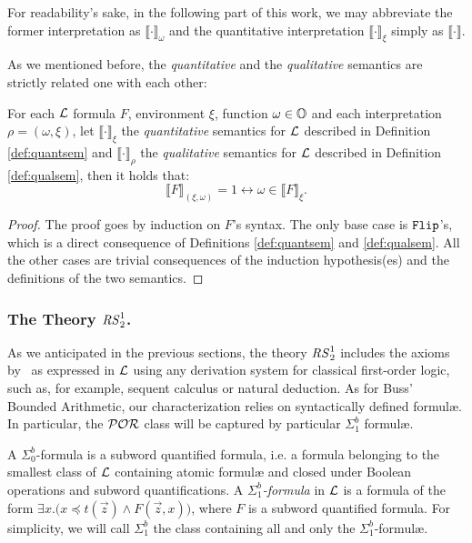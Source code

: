 \begin{notation}
For readability's sake, in the following part of this work, we may abbreviate
the former interpretation as $\llbracket \cdot
\rrbracket_\omega$
and the quantitative interpretation
$\llbracket \cdot\rrbracket_\xi$
simply as $\llbracket \cdot\rrbracket$.
\end{notation}

As we mentioned before, the \emph{quantitative} and the \emph{qualitative} semantics are strictly related one with each other:


\begin{remark}
\label{rem:quantqual}
For each $\mathcal{L}$ formula $F$, environment $\xi$, function $\omega \in \mathbb{O}$ and each interpretation $\rho=(\omega, \xi)$, let $\llbracket \cdot \rrbracket_\xi$ the \emph{quantitative} semantics for $\mathcal{L}$ described in Definition \ref{def:quantsem} and $\llbracket \cdot \rrbracket_{\rho}$ the \emph{qualitative} semantics for $\mathcal{L}$ described in Definition \ref{def:qualsem},
then it holds that:
$$
\llbracket F\big\rrbracket_{(\xi, \omega)} = 1 \leftrightarrow
\omega \in \llbracket F \rrbracket_\xi.
$$
\end{remark}
\begin{proof}
  The proof goes by induction on $F$'s syntax. The only base case is $\mathtt{Flip}$'s, which is a direct consequence of Definitions \ref{def:quantsem} and \ref{def:qualsem}. All the other cases are trivial consequences of the induction hypothesis(es) and the definitions of the two semantics.
\end{proof}
\subsubsection{The Theory ${\mathit{RS}^1_2}$.}
\label{subsub:S13}

As we anticipated in the previous sections, the theory ${\mathit{RS}^1_2}$ includes
the axioms by~\cite{Ferreira90} as
expressed in $\mathcal{L}$ using any derivation system for classical first-order logic, such as, for example, sequent calculus or natural deduction.
%
As for Buss' Bounded Arithmetic, our characterization relies on syntactically defined formul\ae{}. In particular, the $\mathcal{POR}$ class will be captured by particular $\Sigma^b_1$ formul\ae{}.


\begin{defn}\label{df:Sigmab1}
A $\Sigma^b_0$-formula  is a subword quantified formula,
i.e. a formula belonging to the smallest
class of $\mathcal{L}$ containing atomic
formul\ae{} and closed under Boolean operations
and subword quantifications.
A \emph{$\Sigma^b_1$-formula}
in $\mathcal{L}$ is a formula of the form
$\exists x.\big(x\preceq t(\vec{z})\wedge
F(\vec{z},x)\big)$,
where $F$ is a subword quantified formula. For simplicity, we will call $\Sigma^b_1$ the class
containing all and only the $\Sigma^b_1$-formul\ae{}.
\end{defn}


